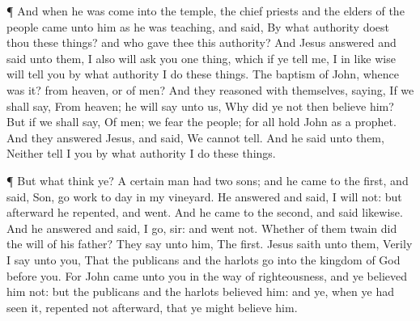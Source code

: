  ¶ And when he was come into the temple, the chief priests
and the elders of the people came unto him as he was teaching, and said,
By what authority doest thou these things? and who gave thee this
authority?  And Jesus answered and said unto them, I also
will ask you one thing, which if ye tell me, I in like wise will tell
you by what authority I do these things.  The baptism of
John, whence was it? from heaven, or of men? And they reasoned with
themselves, saying, If we shall say, From heaven; he will say unto us,
Why did ye not then believe him?  But if we shall say, Of
men; we fear the people; for all hold John as a prophet. 
And they answered Jesus, and said, We cannot tell. And he said unto
them, Neither tell I you by what authority I do these things.

 ¶ But what think ye? A certain man had two sons; and he
came to the first, and said, Son, go work to day in my vineyard.
 He answered and said, I will not: but afterward he
repented, and went.  And he came to the second, and said
likewise. And he answered and said, I go, sir: and went not.
 Whether of them twain did the will of his father? They say
unto him, The first. Jesus saith unto them, Verily I say unto you, That
the publicans and the harlots go into the kingdom of God before you.
 For John came unto you in the way of righteousness, and ye
believed him not: but the publicans and the harlots believed him: and
ye, when ye had seen it, repented not afterward, that ye might believe
him.

